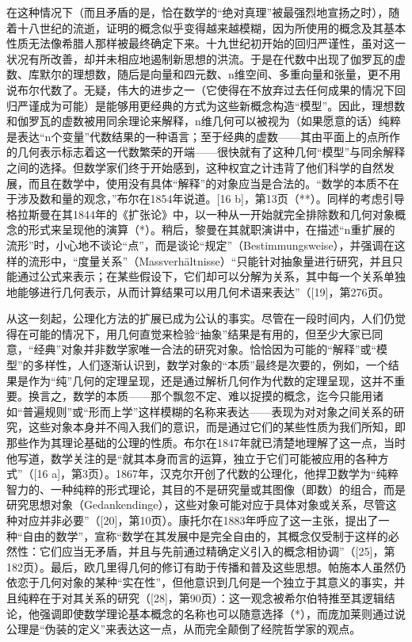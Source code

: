 在这种情况下（而且矛盾的是，恰在数学的“绝对真理”被最强烈地宣扬之时），随着十八世纪的流逝，证明的概念似乎变得越来越模糊，因为所使用的概念及其基本性质无法像希腊人那样被最终确定下来。十九世纪初开始的回归严谨性，虽对这一状况有所改善，却并未相应地遏制新思想的洪流。于是在代数中出现了伽罗瓦的虚数、库默尔的理想数，随后是向量和四元数、n维空间、多重向量和张量，更不用说布尔代数了。无疑，伟大的进步之一（它使得在不放弃过去任何成果的情况下回归严谨成为可能）是能够用更经典的方式为这些新概念构造“模型”。因此，理想数和伽罗瓦的虚数被用同余理论来解释，n维几何可以被视为（如果愿意的话）纯粹是表达“n个变量”代数结果的一种语言；至于经典的虚数——其由平面上的点所作的几何表示标志着这一代数繁荣的开端——很快就有了这种几何“模型”与同余解释之间的选择。但数学家们终于开始感到，这种权宜之计违背了他们科学的自然发展，而且在数学中，使用没有具体“解释”的对象应当是合法的。“数学的本质不在于涉及数和量的观念，”布尔在1854年说道。{[}16 b{]}，第13页（**）。同样的考虑引导格拉斯曼在其1844年的《扩张论》中，以一种从一开始就完全排除数和几何对象概念的形式来呈现他的演算（*）。稍后，黎曼在其就职演讲中，在描述“n重扩展的流形”时，小心地不谈论“点”，而是谈论“规定”（Bestimmungsweise），并强调在这样的流形中，“度量关系”（Massverhältnisse）“只能针对抽象量进行研究，并且只能通过公式来表示；在某些假设下，它们却可以分解为关系，其中每一个关系单独地能够进行几何表示，从而计算结果可以用几何术语来表达”（{[}19{]}，第276页。

从这一刻起，公理化方法的扩展已成为公认的事实。尽管在一段时间内，人们仍觉得在可能的情况下，用几何直觉来检验“抽象”结果是有用的，但至少大家已同意，“经典”对象并非数学家唯一合法的研究对象。恰恰因为可能的“解释”或“模型”的多样性，人们逐渐认识到，数学对象的“本质”最终是次要的，例如，一个结果是作为“纯”几何的定理呈现，还是通过解析几何作为代数的定理呈现，这并不重要。换言之，数学的本质——那个飘忽不定、难以捉摸的概念，迄今只能用诸如“普遍规则”或“形而上学”这样模糊的名称来表达——表现为对对象之间关系的研究，这些对象本身并不闯入我们的意识，而是通过它们的某些性质为我们所知，即那些作为其理论基础的公理的性质。布尔在1847年就已清楚地理解了这一点，当时他写道，数学关注的是“就其本身而言的运算，独立于它们可能被应用的各种方式”（{[}16 a{]}，第3页）。1867年，汉克尔开创了代数的公理化，他捍卫数学为“纯粹智力的、一种纯粹的形式理论，其目的不是研究量或其图像（即数）的组合，而是研究思想对象（Gedankendinge），这些对象可能对应于具体对象或关系，尽管这种对应并非必要”（{[}20{]}，第10页）。康托尔在1883年呼应了这一主张，提出了一种“自由的数学”，宣称“数学在其发展中是完全自由的，其概念仅受制于这样的必然性：它们应当无矛盾，并且与先前通过精确定义引入的概念相协调”（{[}25{]}，第182页）。最后，欧几里得几何的修订有助于传播和普及这些思想。帕施本人虽然仍依恋于几何对象的某种“实在性”，但他意识到几何是一个独立于其意义的事实，并且纯粹在于对其关系的研究（{[}28{]}，第90页）：这一观念被希尔伯特推至其逻辑结论，他强调即使数学理论基本概念的名称也可以随意选择（*），而庞加莱则通过说公理是“伪装的定义”来表达这一点，从而完全颠倒了经院哲学家的观点。

